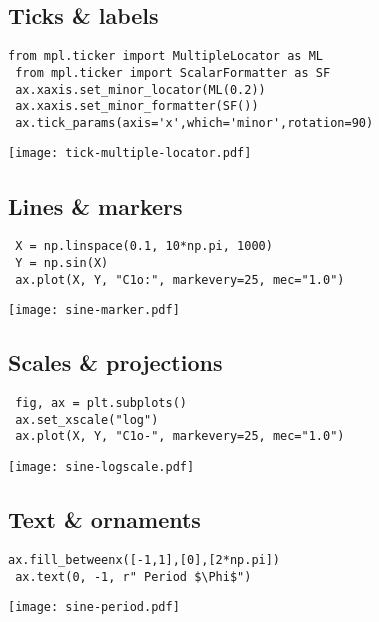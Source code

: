 \documentclass[10pt,landscape,a4paper]{article}
\begin{document}
\begin{multicols*}{3}
\subsection*{\rmfamily Ticks \& labels}

\begin{lstlisting}[basicstyle=\ttfamily\small]
 from mpl.ticker import MultipleLocator as ML
 from mpl.ticker import ScalarFormatter as SF
 ax.xaxis.set_minor_locator(ML(0.2))
 ax.xaxis.set_minor_formatter(SF())
 ax.tick_params(axis='x',which='minor',rotation=90)
\end{lstlisting}
\texttt{[image: tick-multiple-locator.pdf]}

\subsection*{\rmfamily Lines \& markers}

\begin{lstlisting}
 X = np.linspace(0.1, 10*np.pi, 1000)
 Y = np.sin(X)
 ax.plot(X, Y, "C1o:", markevery=25, mec="1.0")
\end{lstlisting}
\texttt{[image: sine-marker.pdf]}

\subsection*{\rmfamily Scales \& projections}

\begin{lstlisting}
 fig, ax = plt.subplots()
 ax.set_xscale("log")
 ax.plot(X, Y, "C1o-", markevery=25, mec="1.0")
\end{lstlisting}
\texttt{[image: sine-logscale.pdf]}

\subsection*{\rmfamily Text \& ornaments}
\begin{lstlisting}[]
 ax.fill_betweenx([-1,1],[0],[2*np.pi])
 ax.text(0, -1, r" Period $\Phi$")
\end{lstlisting}
\texttt{[image: sine-period.pdf]}



\end{multicols*}
\end{document}
